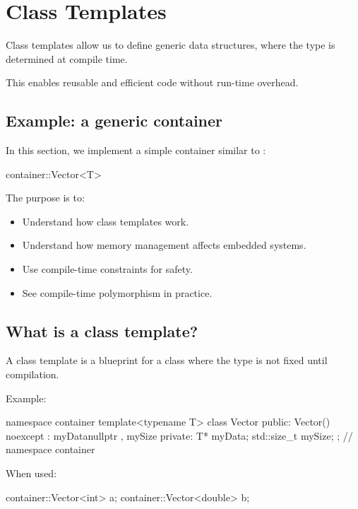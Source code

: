 
\section{Class Templates}
\label{c5:sec:class}\label{c5:app:c}
Class templates allow us to define generic data structures, where the type is determined at
compile time.

This enables reusable and efficient code without run-time overhead.

\subsection{Example: a generic container}
\label{c5:sec:container}
In this section, we implement a simple container similar to :

\begin{cppcode}
container::Vector<T>
\end{cppcode}

\noindent The purpose is to:
\begin{itemize}
  \item Understand how class templates work.
  \item Understand how memory management affects embedded systems.
  \item Use compile-time constraints for safety.
  \item See compile-time polymorphism in practice.
\end{itemize}

\subsection{What is a class template?}
\label{c5:sec:whatisclasstemplate}
A class template is a blueprint for a class where the type is not fixed until compilation.

Example:

\begin{cppcode}
namespace container
{
template<typename T>
class Vector
{
public:
    Vector() noexcept
        : myData{nullptr}
        , mySize{}
    {}
private:
    T* myData;
    std::size_t mySize;
};
} // namespace container
\end{cppcode}

\noindent When used:

\begin{cppcode}
container::Vector<int> a{};
container::Vector<double> b{};
\end{cppcode}


